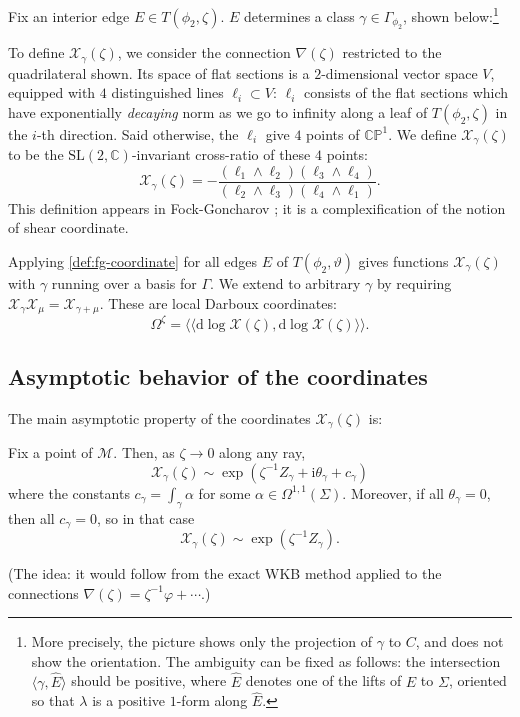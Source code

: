 \documentclass[12pt,letterpaper,reqno]{article}
\numberwithin{equation}{section}
\newcommand{\cM}{\ensuremath{\mathcal M}}
\newcommand{\cX}{\ensuremath{\mathcal X}}
\newcommand{\bbC}{\ensuremath{\mathbb C}}
\newcommand{\bbP}{\ensuremath{\mathbb P}}
\newcommand{\I}{{\mathrm i}}
\newcommand{\de}{\mathrm{d}}
\newcommand{\IP}[1]{\langle#1\rangle}
\newcommand{\DIP}[1]{\langle\!\langle#1\rangle\!\rangle}
\newcommand{\ti}[1]{\textit{#1}}
\newcommand{\SL}{\mathrm{SL}}
\newcommand{\insfig}[2]{

\medskip
\noindent
\begin{minipage}{\linewidth}

\makebox[\linewidth]{\texttt{[image: figures/\#1-crop.pdf]}}

\end{minipage}
\medskip

}
\begin{document}
\begin{defn} \label{def:fg-coordinate}
Fix an interior edge $E \in T(\phi_2,\zeta)$.
$E$ determines a class $\gamma \in \Gamma_{\phi_2}$, shown
below:\footnote{More precisely, the picture shows
only the projection of $\gamma$ to $C$, and does not show
the orientation. The ambiguity can be fixed as follows:
the intersection $\IP{\gamma,\hat E}$ should be positive,
where $\hat E$ denotes one of the lifts of $E$ to $\Sigma$,
oriented so that $\lambda$ is a positive $1$-form
along $\hat E$.}
\insfig{higgs-metric-10}{1.3}
To define $\cX_\gamma(\zeta)$, we consider the connection
$\nabla(\zeta)$ restricted to the quadrilateral shown.
Its space of flat sections is a $2$-dimensional vector space $V$,
equipped with $4$ distinguished lines $\ell_i \subset V$:
$\ell_i$ consists of the flat sections
which have exponentially \ti{decaying} norm 
as we go to infinity along a leaf of $T(\phi_2,\zeta)$ in the $i$-th direction.
Said otherwise, the $\ell_i$ give $4$ points of $\bbC\bbP^1$.
We define $\cX_\gamma(\zeta)$ to be the
$\SL(2,\bbC)$-invariant cross-ratio of these $4$ points:
\begin{equation}
	\cX_\gamma(\zeta) = - \frac{(\ell_1 \wedge \ell_2)(\ell_3 \wedge \ell_4)}{(\ell_2 \wedge \ell_3) (\ell_4 \wedge \ell_1)} .
\end{equation}
This definition appears in
Fock-Goncharov \cite{MR2233852}; it is a complexification of the notion of shear coordinate.
\end{defn}

Applying \autoref{def:fg-coordinate} for all edges $E$
of $T(\phi_2,\vartheta)$ gives functions
$\cX_\gamma(\zeta)$ with $\gamma$ running over a basis for $\Gamma$. 
We extend to arbitrary $\gamma$ by requiring
$\cX_\gamma \cX_\mu = \cX_{\gamma+\mu}$.
These are local
Darboux coordinates:
\begin{equation}
  \Omega^\zeta = \DIP{\de \log \cX(\zeta), \de \log \cX(\zeta)}.
\end{equation}

\subsection{Asymptotic behavior of the coordinates}

The main asymptotic property of the coordinates $\cX_\gamma(\zeta)$ is:
\begin{conj}
Fix a point of $\cM$.
Then, as $\zeta \to 0$ along any ray,
\begin{equation}
  \cX_\gamma(\zeta) \sim \exp \left(\zeta^{-1} Z_\gamma + \I \theta_\gamma + c_\gamma \right)
\end{equation}
where the constants $c_\gamma = \int_\gamma \alpha$
for some $\alpha \in \Omega^{1,1}(\Sigma)$.
Moreover, if all $\theta_\gamma = 0$, then
all $c_\gamma = 0$, so in that case
\begin{equation}
  \cX_\gamma(\zeta) \sim \exp \left(\zeta^{-1} Z_\gamma\right).
\end{equation}
\end{conj}
(The idea: it would follow from the exact WKB method applied to the connections $\nabla(\zeta) = \zeta^{-1} \varphi + \cdots$.)
\end{document}

